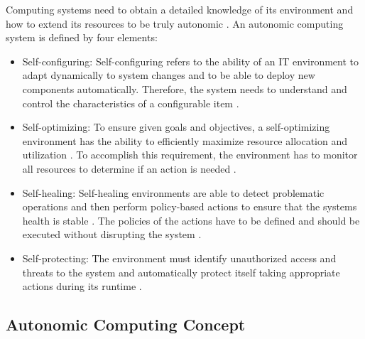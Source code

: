 Computing systems need to obtain a detailed knowledge of its environment and how to extend its resources to be truly autonomic \cite{Murch2004Autonomic}.
An autonomic computing system is defined by four elements:
\begin{itemize}
\item Self-configuring:
Self-configuring refers to the ability of an IT environment to adapt dynamically to system changes and to be able to deploy new components automatically. Therefore, the system needs to understand and control the characteristics of a configurable item \cite{Murch2004Autonomic, Sinreich2006AnAB}.

\item Self-optimizing:
To ensure given goals and objectives, a self-optimizing environment has the ability to efficiently maximize resource allocation and utilization \cite{Jacob2004AutonomicSolution}. To accomplish this requirement, the environment has to monitor all resources to determine if an action is needed \cite{Murch2004Autonomic}.

\item Self-healing:
Self-healing environments are able to detect problematic operations and then perform policy-based actions to ensure that the systems health is stable \cite{Sinreich2006AnAB, Jacob2004AutonomicSolution}. The policies of the actions have to be defined and should be executed without disrupting the system \cite{Sinreich2006AnAB, Jacob2004AutonomicSolution}.

\item Self-protecting:
The environment must identify unauthorized access and threats to the system and automatically protect itself taking appropriate actions during its runtime \cite{Sinreich2006AnAB, Jacob2004AutonomicSolution}.
\end{itemize}


\subsection{Autonomic Computing Concept}

